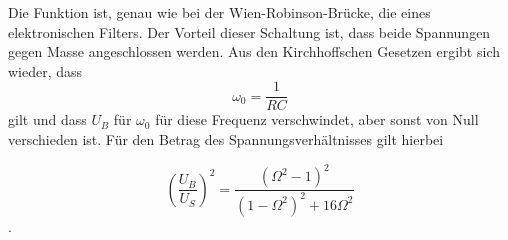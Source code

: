 Die Funktion ist, genau wie bei der Wien-Robinson-Brücke, die eines elektronischen Filters. 
Der Vorteil dieser Schaltung ist, dass beide Spannungen gegen Masse angeschlossen werden. 
Aus den Kirchhoffschen Gesetzen ergibt sich wieder, dass 
\begin{equation}
    \omega_0 = \frac{1}{RC}
\end{equation}
gilt und dass $U_B$ für $\omega_0$ für diese Frequenz verschwindet, aber sonst von Null verschieden ist. 
Für den Betrag des Spannungsverhältnisses gilt hierbei 

\begin{equation}
    (\frac{U_B}{U_S})^2 = \frac{(\Omega^2 -1)^2}{(1- \Omega^2)^2 + 16 \Omega^2}
\end{equation}.



